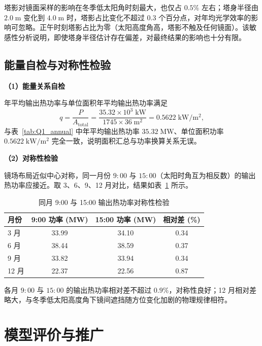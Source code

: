\documentclass[12pt,a4paper,fontset=fandol]{ctexart}
\begin{document}
塔影对镜面采样的影响在冬季低太阳角时刻最大，也仅占 $0.5\%$ 左右；塔身半径由 $2.0\;\mathrm{m}$ 变化到 $4.0\;\mathrm{m}$ 时，塔影占比变化不超过 $0.3$ 个百分点，对年均光学效率的影响可忽略。正午时刻塔影占比为零（太阳高度角高，塔影不触及任何镜面）。该敏感性分析说明，即使塔身半径估计存在偏差，对最终结果的影响也十分有限。

\subsection{能量自检与对称性检验}

\textbf{（1）能量关系自检}

年平均输出热功率与单位面积年平均输出热功率满足
\[
q = \frac{P}{A_{\mathrm{total}}} = \frac{35.32 \times 10^{3}\;\mathrm{kW}}{1745 \times 36\;\mathrm{m}^{2}} = 0.5622\;\mathrm{kW/m^{2}},
\]
与表~\ref{tab:Q1_annual} 中年平均输出热功率 $35.32\;\mathrm{MW}$、单位面积功率 $0.5622\;\mathrm{kW/m^{2}}$ 完全一致，说明面积汇总与功率换算关系无误。

\textbf{（2）对称性检验}

镜场布局近似中心对称，同一月份 $9{:}00$ 与 $15{:}00$（太阳时角互为相反数）的输出热功率应接近。取 3、6、9、12 月对比，结果如表~\ref{tab:symmetry} 所示。

\begin{table}[H]
    \centering
    \small
    \caption{同月 9:00 与 15:00 输出热功率对称性检验}
    \label{tab:symmetry}
    \begin{tabular}{lccc}
        \toprule
        月份 & 9:00 功率 (MW) & 15:00 功率 (MW) & 相对差 (\%) \\
        \midrule
        3 月 & 33.99 & 34.10 & 0.34 \\
        6 月 & 38.44 & 38.59 & 0.37 \\
        9 月 & 33.82 & 33.94 & 0.34 \\
        12 月 & 22.37 & 22.56 & 0.87 \\
        \bottomrule
    \end{tabular}
\end{table}

各月 $9{:}00$ 与 $15{:}00$ 的输出热功率相对差不超过 $0.9\%$，对称性良好；12 月相对差略大，与冬季低太阳高度角下镜间遮挡随方位变化加剧的物理规律相符。

\section{模型评价与推广}
\end{document}
